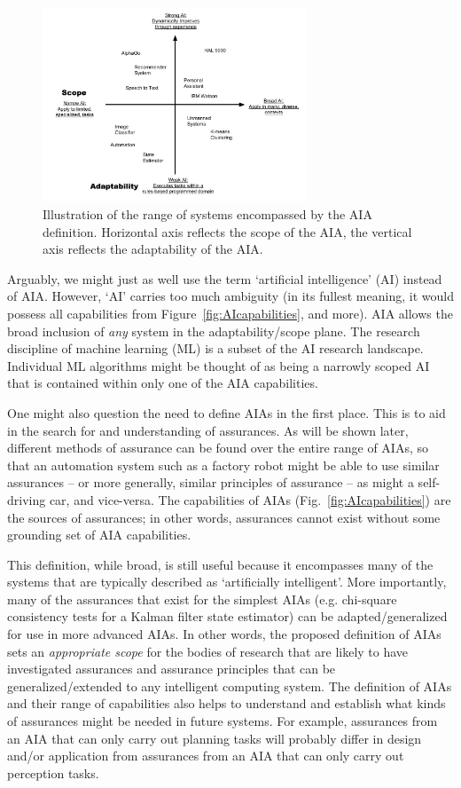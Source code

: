 	\begin{figure}[htbp]
    	\centering
     	\includegraphics[width=0.7\textwidth]{Figures/strong_weak_narrow_broad.pdf}
    	\caption{Illustration of the range of systems encompassed by the AIA definition. Horizontal axis reflects the scope of the AIA, the vertical axis reflects the adaptability of the AIA.}
        \label{fig:StrongWeak}
    \end{figure}

Arguably, we might just as well use the term `artificial intelligence' (AI) instead of AIA. However, `AI' carries too much ambiguity (in its fullest meaning, it would possess all capabilities from Figure~\ref{fig:AIcapabilities}, and more). AIA allows the broad inclusion of \emph{any} system in the adaptability/scope plane. The research discipline of machine learning (ML) is a subset of the AI research landscape. Individual ML algorithms might be thought of as being a narrowly scoped AI that is contained within only one of the AIA capabilities. 

One might also question the need to define AIAs in the first place. This is to aid in the search for and understanding of assurances. As will be shown later, different methods of assurance can be found over the entire range of AIAs, so that an automation system such as a factory robot might be able to use similar assurances -- or more generally, similar principles of assurance -- as might a self-driving car, and vice-versa. The capabilities of AIAs (Fig.~\ref{fig:AIcapabilities}) are the sources of assurances; in other words, assurances cannot exist without some grounding set of AIA capabilities. 

This definition, while broad, is still useful because it encompasses many of the systems that are typically described as `artificially intelligent'. More importantly, many of the assurances that exist for the simplest AIAs (e.g. chi-square consistency tests for a Kalman filter state estimator) can be adapted/generalized for use in more advanced AIAs. In other words, the proposed definition of AIAs sets an \emph{appropriate scope} for the bodies of research that are likely to have investigated assurances and assurance principles that can be generalized/extended to any intelligent computing system. The definition of AIAs and their range of capabilities also helps to understand and establish what kinds of assurances might be needed in future systems. For example, assurances from an AIA that can only carry out planning tasks will probably differ in design and/or application from assurances from an AIA that can only carry out perception tasks. 
